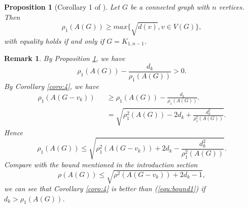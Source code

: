 \documentclass[amsthm]{elsart}
\newtheorem{proposition}{Proposition}[section]
\newtheorem{remark}{Remark}[section]
\begin{document}
\begin{proposition} [Corollary 1 of \cite{2019Sharp}] \label{prop:remark1}
Let $G$ be a connected graph with $n$ vertices. Then
$$ \rho_1(A(G)) \geqslant max \{ \sqrt{d(v)},  v \in V(G)  \}, $$
with equality holds if and only if $G = K_{1,n-1}$.
\end{proposition}

\begin{remark} \label{remark:1}
By Proposition \ref{prop:remark1}, we have
\begin{equation*}
\rho _1(A(G)) - \frac{d_k}{\rho _1(A(G))} > 0.
\end{equation*}
By Corollary \ref{coro:4}, we have
\begin{eqnarray*}
\rho _1 (A(G - v_k))
&& \geqslant \rho _1(A(G)) - \frac{d_k}{\rho _1(A(G))}.
\\ && = \sqrt{\rho _1^2(A(G)) - 2d_k + \frac{d_k^2}{\rho _1^2(A(G))}}.
\end{eqnarray*}
Hence
\begin{equation*}
\rho _1(A(G)) \leqslant \sqrt{\rho _1^2 (A(G - v_k)) + 2 d_k - \frac{d_k^2}{\rho _1^2(A(G))}}.
\end{equation*}
 Compare with the bound \cite{2019A} mentioned in the introduction section
 \begin{equation} \label{equ:bound1}
 \rho(A(G)) \leqslant \sqrt{\rho^2(A(G - v_k)) + 2 d_k - 1},
 \end{equation}
 we can see that Corollary \ref{coro:4} is better than (\ref{equ:bound1}) if $ d_k > \rho _1(A(G))$.
\end{remark}
\end{document}
